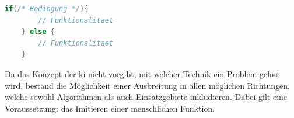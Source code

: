 \begin{lstlisting}[label={lst:Zuordnung},language=Java,caption={Zuordnung mit einer if/else-Verzeigung}]
    if(/* Bedingung */){
        // Funktionalitaet
    } else {
        // Funktionalitaet
    }
\end{lstlisting}

Da das Konzept der \gls{ki} nicht vorgibt, mit welcher Technik ein Problem gelöst wird, bestand die Möglichkeit einer Ausbreitung in allen möglichen Richtungen, welche sowohl Algorithmen als auch Einsatzgebiete inkludieren. Dabei gilt eine Voraussetzung: das Imitieren einer menschlichen Funktion.